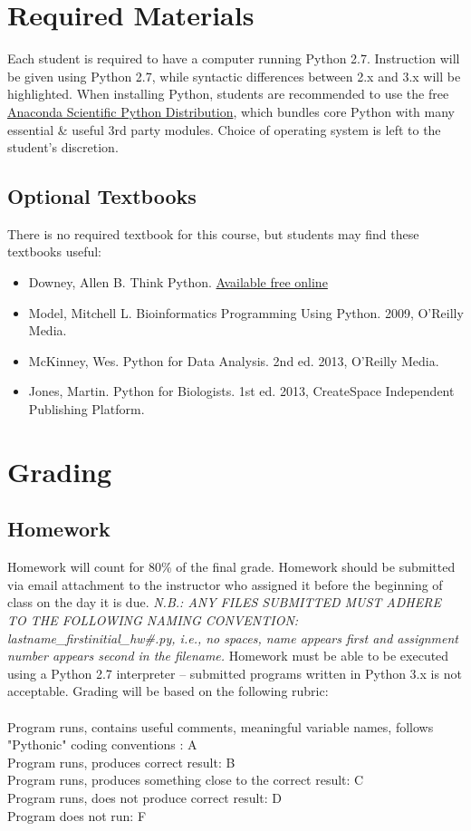 \documentclass{article}
\begin{document}
\section{Required Materials}
Each student is required to have a computer running Python 2.7. Instruction will be given using Python 2.7, while syntactic differences between 2.x and 3.x will be highlighted. When installing Python, students are recommended to use the free \href{https://store.continuum.io/cshop/anaconda}{Anaconda Scientific Python Distribution}, which bundles core Python with many essential \& useful 3rd party modules. Choice of operating system is left to the student's discretion. 
\subsection{Optional Textbooks}
There is no required textbook for this course, but students may find these textbooks useful:
\begin{itemize}
   \item Downey, Allen B. Think Python. \href{http://www.greenteapress.com/thinkpython/html/index.html}{Available free online}
   \item Model, Mitchell L. Bioinformatics Programming Using Python. 2009, O'Reilly Media.
   \item McKinney, Wes. Python for Data Analysis. 2nd ed. 2013, O'Reilly Media.
   \item Jones, Martin. Python for Biologists. 1st ed. 2013, CreateSpace Independent Publishing Platform.
\end{itemize}
\section{Grading} 
\subsection{Homework}
Homework will count for 80\% of the final grade. Homework should be submitted via email attachment to the instructor who assigned it before the beginning of class on the day it is due. \emph{N.B.: ANY FILES SUBMITTED MUST ADHERE TO THE FOLLOWING NAMING CONVENTION: lastname\_firstinitial\_hw\#.py, i.e., no spaces, name appears first and assignment number appears second in the filename.} Homework must be able to be executed using a Python 2.7 interpreter -- submitted programs written in Python 3.x is not acceptable. Grading will be based on the following rubric:\\ \\
Program runs, contains useful comments, meaningful variable names, follows "Pythonic" coding conventions : A \\
Program runs, produces correct result: B \\
Program runs, produces something close to the correct result: C \\
Program runs, does not produce correct result: D \\
Program does not run: F
\end{document}
